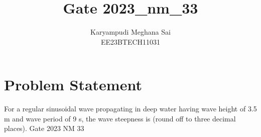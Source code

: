 \documentclass[12pt]{article}
\title{Gate 2023\_nm\_33}
\author{Karyampudi Meghana Sai \\
        EE23BTECH11031}
\begin{document}
\maketitle

\section*{Problem Statement}

For a regular sinusoidal wave propagating in deep water having wave height of 3.5 m and wave period of 9 s, the wave steepness is \underline{\hspace{1cm}} (round off to three decimal places).
\hfill Gate 2023 NM 33
\end{document}
